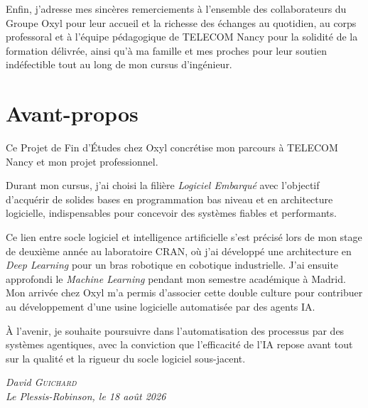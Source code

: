 \documentclass{tnreport}
\begin{document}
Enfin, j'adresse mes sincères remerciements à l'ensemble des collaborateurs du Groupe Oxyl pour leur accueil et la richesse des échanges au quotidien, au corps professoral et à l'équipe pédagogique de TELECOM Nancy pour la solidité de la formation délivrée, ainsi qu'à ma famille et mes proches pour leur soutien indéfectible tout au long de mon cursus d'ingénieur.


\cleardoublepage

\section*{Avant-propos}

Ce Projet de Fin d'Études chez Oxyl concrétise mon parcours à TELECOM Nancy et mon projet professionnel.

Durant mon cursus, j'ai choisi la filière \textit{Logiciel Embarqué} avec l'objectif d'acquérir de solides bases en programmation bas niveau et en architecture logicielle, indispensables pour concevoir des systèmes fiables et performants.

Ce lien entre socle logiciel et intelligence artificielle s'est précisé lors de mon stage de deuxième année au laboratoire CRAN, où j'ai développé une architecture en \textit{Deep Learning} pour un bras robotique en cobotique industrielle. J'ai ensuite approfondi le \textit{Machine Learning} pendant mon semestre académique à Madrid. Mon arrivée chez Oxyl m'a permis d'associer cette double culture pour contribuer au développement d'une usine logicielle automatisée par des agents IA.

À l'avenir, je souhaite poursuivre dans l'automatisation des processus par des systèmes agentiques, avec la conviction que l'efficacité de l'IA repose avant tout sur la qualité et la rigueur du socle logiciel sous-jacent.

\vspace{1cm}
\begin{flushright}
    \textit{David \textsc{Guichard}}\\
    \textit{Le Plessis-Robinson, le 18 août 2026}
\end{flushright}


\cleardoublepage

\renewcommand{\baselinestretch}{0.5}\normalsize
\tableofcontents
\renewcommand{\baselinestretch}{1.0}\normalsize
\cleardoublepage

\setcounter{page}{1}
\end{document}
